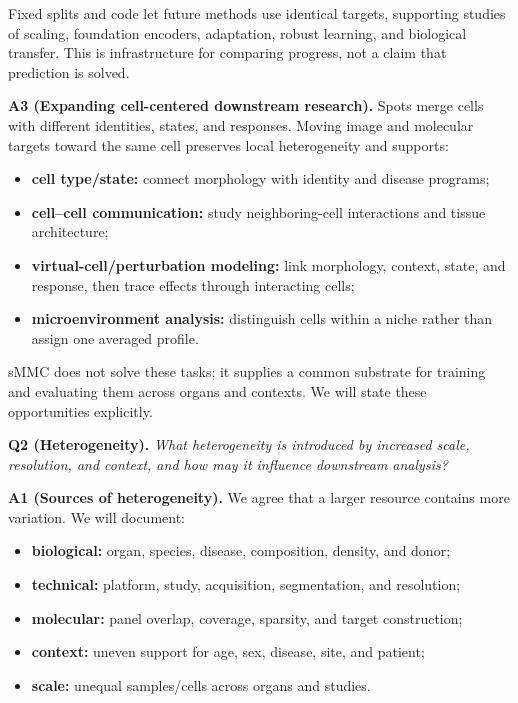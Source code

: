 \documentclass[10pt]{article}
\newcommand{\questionsep}{\par\vspace{1em}}
\begin{document}
Fixed splits and code let future methods use identical targets, supporting
studies of scaling, foundation encoders, adaptation, robust learning, and
biological transfer. This is infrastructure for comparing progress, not a
claim that prediction is solved.

\textbf{A3 (Expanding cell-centered downstream research).}\enspace
Spots merge cells with different identities, states, and responses. Moving
image and molecular targets toward the same cell preserves local heterogeneity
and supports:
\begin{itemize}
\item \textbf{cell type/state:} connect morphology with identity and disease
programs;
\item \textbf{cell--cell communication:} study neighboring-cell interactions
and tissue architecture;
\item \textbf{virtual-cell/perturbation modeling:} link morphology, context,
state, and response, then trace effects through interacting cells;
\item \textbf{microenvironment analysis:} distinguish cells within a niche
rather than assign one averaged profile.
\end{itemize}

sMMC does not solve these tasks; it supplies a common substrate for training
and evaluating them across organs and contexts. We will state these
opportunities explicitly.

\questionsep
\textbf{Q2 (Heterogeneity).}\quad
\textit{What heterogeneity is introduced by increased scale, resolution, and
context, and how may it influence downstream analysis?}

\textbf{A1 (Sources of heterogeneity).}\enspace
We agree that a larger resource contains more variation. We will document:
\begin{itemize}
\item \textbf{biological:} organ, species, disease, composition, density, and
donor;
\item \textbf{technical:} platform, study, acquisition, segmentation, and
resolution;
\item \textbf{molecular:} panel overlap, coverage, sparsity, and target
construction;
\item \textbf{context:} uneven support for age, sex, disease, site, and
patient;
\item \textbf{scale:} unequal samples/cells across organs and studies.
\end{itemize}
\end{document}
